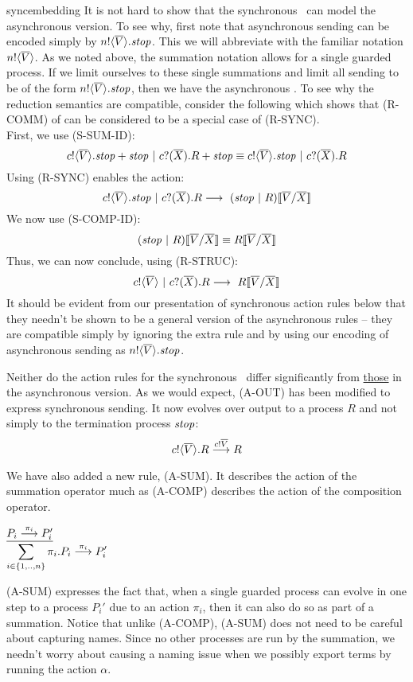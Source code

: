 \begin{example}{syncembedding}
	It is not hard to show that the synchronous \picalc\ can model the asynchronous version.  
To see why, first note that asynchronous sending can be encoded simply by ${n}!\langle{ \ensuremath{\overline{V}} }\rangle.\mbox{\emph{stop}}$.  
This we will abbreviate with the familiar notation ${n}!\langle{ \ensuremath{\overline{V}} }\rangle$.  
As we noted above, the summation notation allows for a single guarded process.  
If we limit ourselves to these single summations and limit all sending to be of the form ${n}!\langle{ \ensuremath{\overline{V}} }\rangle.\mbox{\emph{stop}}$, then we have the asynchronous \picalc.  
To see why the reduction semantics are compatible, consider the following which shows that (R-COMM) of  can be considered to be a special case of (R-SYNC).\\

\noindent First, we use (S-SUM-ID):
\[
	{c}!\langle{ \ensuremath{\overline{V}} }\rangle. \mbox{\emph{stop}} + \mbox{\emph{stop}} \ |\  {c}?({\overline{X}}).R + \mbox{\emph{stop}} \equiv {c}!\langle{ \ensuremath{\overline{V}} }\rangle.\mbox{\emph{stop}} \ |\  {c}?({\overline{X}}).R
\]
Using (R-SYNC) enables the action:
\[
	{c}!\langle{ \ensuremath{\overline{V}} }\rangle.\mbox{\emph{stop}} \ |\  {c}?({\overline{X}}).R \longrightarrow\  (\mbox{\emph{stop}} \ |\  R)\llbracket{ \ensuremath{\overline{V}} }/{\overline{X}}\rrbracket
\]
We now use (S-COMP-ID):
\[
	(\mbox{\emph{stop}} \ |\  R)\llbracket{ \ensuremath{\overline{V}} }/{\overline{X}}\rrbracket\equiv R\llbracket{ \ensuremath{\overline{V}} }/{\overline{X}}\rrbracket
\]
Thus, we can now conclude, using (R-STRUC):
\[
	{c}!\langle{ \ensuremath{\overline{V}} }\rangle \ |\  {c}?({\overline{X}}).R \longrightarrow\  R \llbracket{ \ensuremath{\overline{V}} }/{\overline{X}}\rrbracket
\]
	It should be evident from our presentation of synchronous action rules below that they needn't be shown to be a general version of the asynchronous rules -- they are compatible simply by ignoring the extra rule and by using our encoding of asynchronous sending as ${n}!\langle{ \ensuremath{\overline{V}} }\rangle.\mbox{\emph{stop}}$.
\end{example}

Neither do the action rules for the synchronous \picalc\ differ significantly from \hyperref[apiactionrules]{those} in the asynchronous version.  
As we would expect, (A-OUT) has been modified to express synchronous sending. 
It now evolves over output to a process $R$ and not simply to the termination process $\mbox{\emph{stop}}$:
\[
	{c}!\langle{ \ensuremath{\overline{V}} }\rangle.R \overset{{{c}!{\overline{V}}}}{\longrightarrow} R	
\]

We have also added a new rule, (A-SUM). It describes the action of the summation operator much as (A-COMP) describes the action of the composition operator.
\begin{center}
	$\underline{P_i \overset{{\pi_i}}{\longrightarrow} P_i'}$\\
	$\displaystyle\sum_{i\in \{1,..,n\}}\pi_i.P_i \overset{{\pi_i}}{\longrightarrow} P_i'$\\
\end{center}
(A-SUM) expresses the fact that, when a single guarded process can evolve in one step to a process $P_i'$ due to an action $\pi_i$, then it can also do so as part of a summation.
Notice that unlike (A-COMP), (A-SUM) does not need to be careful about capturing names. 
Since no other processes are run by the summation, we needn't worry about causing a naming issue when we possibly export terms by running the action $\alpha$.

